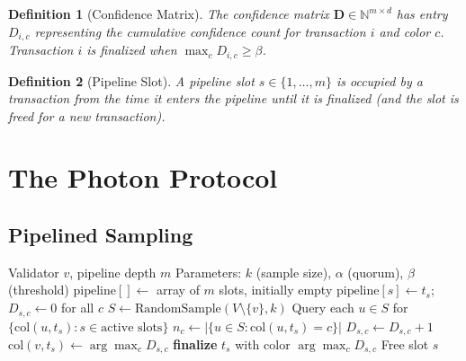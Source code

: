 \documentclass[11pt,a4paper]{article}
\newtheorem{definition}{Definition}[section]
\begin{document}
\begin{definition}[Confidence Matrix]
The confidence matrix $\mathbf{D} \in \mathbb{N}^{m \times d}$ has entry $D_{i,c}$
representing the cumulative confidence count for transaction $i$ and color $c$.
Transaction $i$ is finalized when $\max_c D_{i,c} \geq \beta$.
\end{definition}

\begin{definition}[Pipeline Slot]
A pipeline slot $s \in \{1, \ldots, m\}$ is occupied by a transaction from the time
it enters the pipeline until it is finalized (and the slot is freed for a new transaction).
\end{definition}

\section{The Photon Protocol}
\label{sec:protocol}

\subsection{Pipelined Sampling}

\begin{algorithm}[H]
\caption{Photon Protocol --- Pipelined Consensus}
\label{alg:photon-core}
\begin{algorithmic}[1]
\Require Validator $v$, pipeline depth $m$
\Require Parameters: $k$ (sample size), $\alpha$ (quorum), $\beta$ (threshold)
\State $\text{pipeline}[] \gets$ array of $m$ slots, initially empty
\Loop
    \State {}
            \State $\text{pipeline}[s] \gets t_s$; $D_{s,c} \gets 0$ for all $c$
        \EndIf
    \EndFor
    \State $S \gets \text{RandomSample}(V \setminus \{v\}, k)$
    \State {}
    \State Query each $u \in S$ for $\{\text{col}(u, t_s) : s \in \text{active slots}\}$
            \State $n_c \gets |\{u \in S : \text{col}(u, t_s) = c\}|$
                \State $D_{s,c} \gets D_{s,c} + 1$
            \EndIf
        \EndFor
        \State $\text{col}(v, t_s) \gets \arg\max_c D_{s,c}$
            \State \textbf{finalize} $t_s$ with color $\arg\max_c D_{s,c}$
            \State Free slot $s$
        \EndIf
    \EndFor
\EndLoop
\end{algorithmic}
\end{algorithm}
\end{document}
